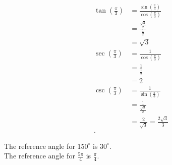 \begin{solution}
	\label{sol:find_tan_sec_csc_cot_3}

	\begin{align*}
		\tan \left(\frac{\pi}{3}\right) & = \frac{\sin \left(\frac{\pi}{3}\right)}{\cos \left(\frac{\pi}{3}\right)} \\
		                                & = \frac{\frac{\sqrt{3}}{2}}{\frac{1}{2}}                                  \\
		                                & = \sqrt{3}                                                                \\
		\sec \left(\frac{\pi}{3}\right) & = \frac{1}{\cos \left(\frac{\pi}{3}\right)}                               \\
		                                & = \frac{1}{\frac{1}{2}}                                                   \\
		                                & = 2                                                                       \\
		\csc \left(\frac{\pi}{3}\right) & = \frac{1}{\sin \left(\frac{\pi}{3}\right)}                               \\
		                                & = \frac{1}{\frac{\sqrt{3}}{2}}                                            \\
		                                & = \frac{2}{\sqrt{3}} = \frac{2\sqrt{3}}{3}                                \\
		.\end{align*}
\end{solution}

\begin{solution}
	\label{sol:find_reference_angle_1}

	The reference angle for $150^{\circ}$ is $30^{\circ}$. \\
	The reference angle for $\frac{5\pi}{4}$ is $\frac{\pi}{4}$.
\end{solution}

